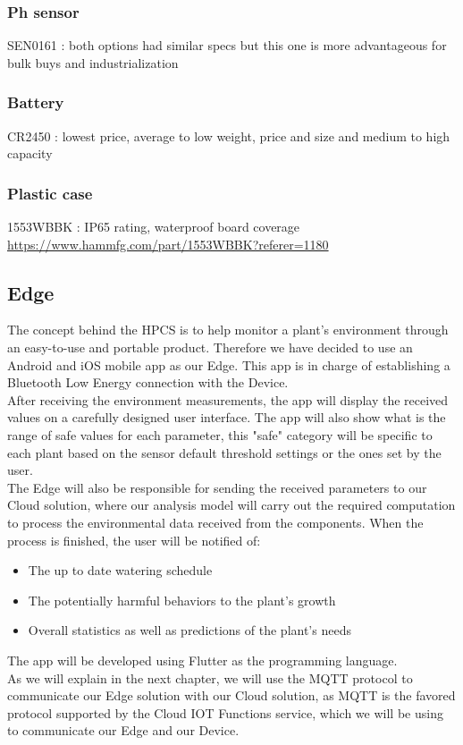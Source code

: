\subsubsection{Ph sensor}
SEN0161 : both options had similar specs but this one is more advantageous for bulk buys and industrialization
\subsubsection{Battery}
CR2450 : lowest price, average to low weight, price and size and medium to high capacity
\subsubsection{Plastic case}
1553WBBK : IP65 rating, waterproof board coverage 
\url{https://www.hammfg.com/part/1553WBBK?referer=1180}

\subsection{Edge}
The concept behind the HPCS is to help monitor a plant's environment through an easy-to-use and portable product. Therefore we have decided to use an Android and iOS mobile app as our Edge. This app is in charge of establishing a Bluetooth Low Energy connection with the Device. \\
After receiving the environment measurements, the app will display the received values on a carefully designed user interface. The app will also show what is the range of safe values for each parameter, this "safe" category will be specific to each plant based on the sensor default threshold settings or the ones set by the user. \\
The Edge will also be responsible for sending the received parameters to our Cloud solution, where our analysis model will carry out the required computation to process the environmental data received from the components. When the process is finished, the user will be notified of:
\begin{itemize}
    \item The up to date watering schedule
    \item The potentially harmful behaviors to the plant's growth
    \item Overall statistics as well as predictions of the plant's needs
\end{itemize}

The app will be developed using Flutter as the programming language.\\
As we will explain in the next chapter, we will use the MQTT protocol to communicate our Edge solution with our Cloud solution, as MQTT is the favored protocol supported by the Cloud IOT Functions service, which we will be using to communicate our Edge and our Device.


